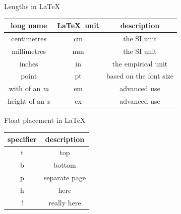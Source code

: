 \documentclass[final,aspectratio=43]{beamer}
\begin{document}
\begin{frame}{Lengths in \LaTeX}
    \centering
    \begin{tabular}{ccc}
        long name & \LaTeX\ unit & description \\
        \hline
        centimetres & cm & the SI unit\\
        millimetres & mm & the SI unit\\
        inches & in & the empirical unit\\
        point & pt & based on the font size\\
        with of an \emph{m} & em & advanced use \\
        height of an \emph{x} & ex & advanced use\\
    \end{tabular}
    
\end{frame}

\begin{frame}{Float placement in \LaTeX}
    \centering
    \begin{tabular}{cc}
        specifier & description \\
        \hline
        t & top\\
        b & bottom\\
        p & separate page\\
        h & here\\
        ! & really here \\

    \end{tabular}
\end{frame}
\end{document}
